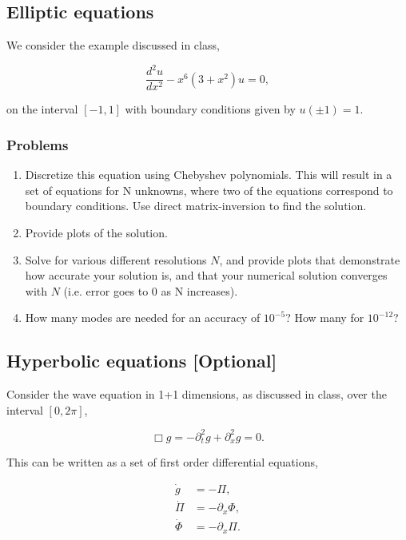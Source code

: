 \subsection{Elliptic equations}

We consider the example discussed in class, 

\begin{equation}
    \dfrac{d^2 u}{dx^2} - x^6(3+x^2)u = 0,
\end{equation}

on the interval $ [-1,1] $ with boundary conditions given by $ u(\pm 1) = 1 $.

\subsubsection{Problems}

\begin{enumerate}

    \item Discretize this equation using Chebyshev polynomials. This will result in a set of equations for N unknowns, where two of the equations correspond to boundary conditions. Use direct matrix-inversion to find the solution.
    \item Provide plots of the solution.
    \item Solve for various different resolutions $N$, and provide plots that demonstrate how accurate your solution is, and that your numerical solution converges with $N$ (i.e. error goes to 0 as N increases).
    \item How many modes are needed for an accuracy of $10^{-5}$? How many for $ 10^{-12} $?
\end{enumerate}

\subsection{Hyperbolic equations [Optional]}

Consider the wave equation in 1+1 dimensions, as discussed in class, over the interval $ [0,2\pi] $,

\begin{equation}
    \Box g = -\partial_t ^2 g + \partial_x ^2 g = 0.
\end{equation}

This can be written as a set of first order differential equations,

\begin{align*}
    \dot{g} &= -\Pi, \\
    \dot{\Pi} &= -\partial_x \Phi, \\
    \dot{\Phi} &= -\partial_x \Pi.
\end{align*}
    
